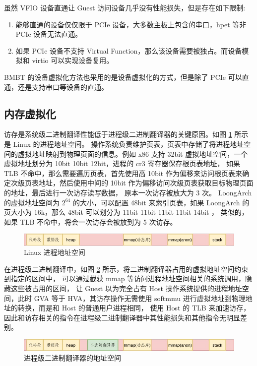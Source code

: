 虽然 VFIO 设备直通让 Guest 访问设备几乎没有性能损失，但是存在如下限制:
\begin{enumerate}
	\item 能够直通的设备仅仅限于 PCIe 设备，大多数主板上包含的串口，hpet 等非 PCIe 设备无法直通。
	\item 如果 PCIe 设备不支持 Virtual Function，那么该设备需要被独占。而设备模拟和 virtio 可以实现设备复用。
\end{enumerate}

BMBT 的设备虚拟化方法也采用的是设备虚拟化的方式，但是除了 PCIe 可以直通，还是支持串口等设备的直通。

\subsection{内存虚拟化}\label{subsection:memory_virt}
访存是系统级二进制翻译性能低于进程级二进制翻译器的关键原因。如图 \ref{fig:user-as} 所示是 Linux 的进程地址空间。
操作系统负责维护页表，页表中存储了将进程地址空间的虚拟地址映射到物理页面的信息。例如 x86 支持 32bit 虚拟地址空间，一个虚拟地址划分为 10bit 10bit 12bit，进程的 cr3 寄存器保存根页表地址，
如果 TLB 不命中，那么需要遍历页表，首先使用高 10bit 作为偏移来访问根页表来确定次级页表地址，然后使用中间的 10bit 作为偏移访问次级页表获取目标物理页面的地址，最后进行一次访存读写数据，
原本一次访存被放大为 3 次。 LoongArch 的虚拟地址空间为 $2^{64}$ 的大小，可以配置 48bit 来索引页表，如果 LoongArch 的页大小为 16k，那么 48bit 可以划分为 11bit 11bit 11bit 11bit 14bit ，
类似的，如果 TLB 不命中，将会一次访存会被放到为 5 次访存。

\begin{figure}[!htbp]
	\centering
	\includegraphics[width=1.0\textwidth]{./images/user-as.jpg}
	\caption{Linux 进程地址空间}
	\label{fig:user-as}
\end{figure}

在进程级二进制翻译中，如图 \ref{fig:user-as2} 所示，将二进制翻译器占用的虚拟地址空间约束到指定的区间中，
可以通过截获 mmap 等访问进程地址空间相关的系统调用，隐藏这些被占用的区间，
让 Guest 以为完全占有 Host 操作系统提供的进程地址空间，此时 GVA 等于 HVA，其访存操作无需使用 softmmu 进行虚拟地址到物理地址的转换，而是和 Host 的普通用户进程相同，
使用 Host 的 TLB 来加速访存，因此和访存相关的指令在进程级二进制翻译器中其性能损失和其他指令无明显差别。

\begin{figure}[!htbp]
	\centering
	\includegraphics[width=1.0\textwidth]{./images/user-as2.jpg}
	\caption{进程级二进制翻译器的地址空间}
	\label{fig:user-as2}
\end{figure}

